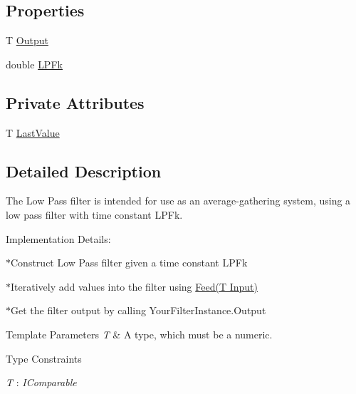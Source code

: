 \subsection*{Properties}
\begin{DoxyCompactItemize}
\item 
T \hyperlink{class_robotics_library_1_1_filters_1_1_low_pass_a83f66e4bfd6737c56614f3bb9a73876f}{Output}
\item 
double \hyperlink{class_robotics_library_1_1_filters_1_1_low_pass_aa10538fde21bb3d7a4c5640b615c4013}{L\+P\+Fk}
\end{DoxyCompactItemize}
\subsection*{Private Attributes}
\begin{DoxyCompactItemize}
\item 
T \hyperlink{class_robotics_library_1_1_filters_1_1_low_pass_a0d00e590f0cdafdd06200870121e9b07}{Last\+Value}
\end{DoxyCompactItemize}


\subsection{Detailed Description}
The Low Pass filter is intended for use as an average-\/gathering system, using a low pass filter with time constant {\ttfamily L\+P\+Fk}.

Implementation Details\+:

$\ast$\+Construct Low Pass filter given a time constant {\ttfamily L\+P\+Fk}

$\ast$\+Iteratively add values into the filter using {\ttfamily \hyperlink{class_robotics_library_1_1_filters_1_1_low_pass_adba4c542b4935845404729ebb2222b72}{Feed(\+T Input)}}

$\ast$\+Get the filter output by calling {\ttfamily Your\+Filter\+Instance.\+Output}


\begin{DoxyTemplParams}{Template Parameters}
{\em T} & A type, which must be a numeric.\\
\hline
\end{DoxyTemplParams}
\begin{Desc}
\item[Type Constraints]\begin{description}
\item[{\em T} : {\em I\+Comparable}]\end{description}
\end{Desc}


